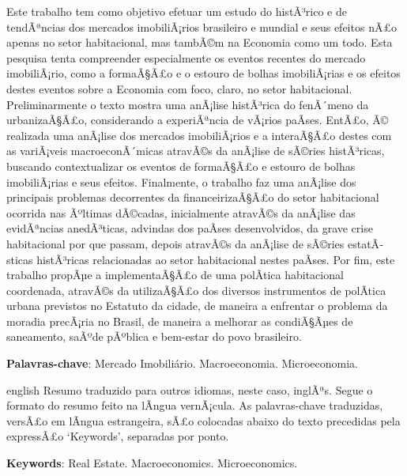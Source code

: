\documentclass[
	12pt,				%
	oneside,			%
	a4paper,			%
	chapter=TITLE,		%
	section=TITLE,		%
	english,			%
	brazil				%
	]{abntex2}
\begin{document}
\setlength{\absparsep}{18pt} %
\begin{resumo}
	\SingleSpacing
  Este trabalho tem como objetivo efetuar um estudo do histÃ³rico e de tendÃªncias
  dos mercados imobiliÃ¡rios brasileiro e mundial e seus efeitos nÃ£o apenas no
  setor habitacional, mas tambÃ©m na Economia como um todo. Esta pesquisa tenta
  compreender especialmente os eventos recentes do mercado imobiliÃ¡rio, como a
  formaÃ§Ã£o e o estouro de bolhas imobiliÃ¡rias e os efeitos destes eventos sobre a
  Economia com foco, claro, no setor habitacional. Preliminarmente o texto mostra
  uma anÃ¡lise histÃ³rica do fenÃ´meno da urbanizaÃ§Ã£o, considerando a experiÃªncia de
  vÃ¡rios paÃ­ses. EntÃ£o, Ã© realizada uma anÃ¡lise dos mercados imobiliÃ¡rios e a
  interaÃ§Ã£o destes com as variÃ¡veis macroeconÃ´micas atravÃ©s da anÃ¡lise de sÃ©ries
  histÃ³ricas, buscando contextualizar os eventos de formaÃ§Ã£o e estouro de bolhas
  imobiliÃ¡rias e seus efeitos. Finalmente, o trabalho faz uma anÃ¡lise dos
  principais problemas decorrentes da financeirizaÃ§Ã£o do setor habitacional
  ocorrida nas Ãºltimas dÃ©cadas, inicialmente atravÃ©s da anÃ¡lise das evidÃªncias
  anedÃ³ticas, advindas dos paÃ­ses desenvolvidos, da grave crise habitacional por
  que passam, depois atravÃ©s da anÃ¡lise de sÃ©ries estatÃ­sticas histÃ³ricas
  relacionadas ao setor habitacional nestes paÃ­ses. Por fim, este trabalho propÃµe
  a implementaÃ§Ã£o de uma polÃ­tica habitacional coordenada, atravÃ©s da utilizaÃ§Ã£o
  dos diversos instrumentos de polÃ­tica urbana previstos no Estatuto da cidade, de
  maneira a enfrentar o problema da moradia precÃ¡ria no Brasil, de maneira a
  melhorar as condiÃ§Ãµes de saneamento, saÃºde pÃºblica e bem-estar do povo
  brasileiro. 
  
  \textbf{Palavras-chave}: 
    Mercado Imobiliário.
    Macroeconomia.
    Microeconomia.
  \end{resumo}
\begin{resumo}[Abstract]
	\SingleSpacing
	\begin{otherlanguage*}{english}
		Resumo traduzido para outros idiomas, neste caso, inglÃªs. Segue o formato do resumo feito na lÃ­ngua vernÃ¡cula. As palavras-chave traduzidas, versÃ£o em lÃ­ngua estrangeira, sÃ£o colocadas abaixo do texto precedidas pela expressÃ£o `Keywords', separadas por ponto.
		
		\textbf{Keywords}:
	      Real Estate.
        Macroeconomics.
        Microeconomics.
    	\end{otherlanguage*}
\end{resumo}
\end{document}
